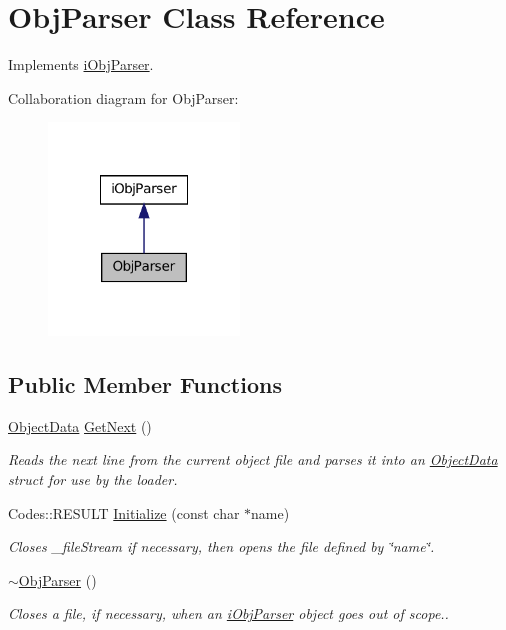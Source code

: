 \hypertarget{classObjParser}{
\section{ObjParser Class Reference}
\label{classObjParser}
}


Implements \hyperlink{classiObjParser}{iObjParser}.  




Collaboration diagram for ObjParser:\nopagebreak
\begin{figure}[H]
\begin{center}
\leavevmode
\includegraphics[width=144pt]{classObjParser__coll__graph}
\end{center}
\end{figure}
\subsection*{Public Member Functions}
\begin{DoxyCompactItemize}
\item 
\hyperlink{structObjectData}{ObjectData} \hyperlink{classObjParser_a653f83071fd63e3fdf04f28699f2fff5}{GetNext} ()
\begin{DoxyCompactList}\small\item\em Reads the next line from the current object file and parses it into an \hyperlink{structObjectData}{ObjectData} struct for use by the loader. \item\end{DoxyCompactList}\item 
Codes::RESULT \hyperlink{classObjParser_ae8d9939f390a68901e256d8a3187c24a}{Initialize} (const char $\ast$name)
\begin{DoxyCompactList}\small\item\em Closes \_\-fileStream if necessary, then opens the file defined by \char`\"{}name\char`\"{}. \item\end{DoxyCompactList}\item 
\hypertarget{classObjParser_aea8cf97813333011fcfa8ed67327009d}{
\hyperlink{classObjParser_aea8cf97813333011fcfa8ed67327009d}{$\sim$ObjParser} ()}
\label{classObjParser_aea8cf97813333011fcfa8ed67327009d}

\begin{DoxyCompactList}\small\item\em Closes a file, if necessary, when an \hyperlink{classiObjParser}{iObjParser} object goes out of scope.. \item\end{DoxyCompactList}\end{DoxyCompactItemize}

